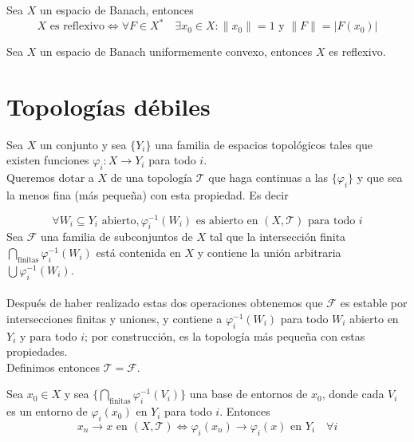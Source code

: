 \documentclass[12pt]{book}
\begin{document}
\begin{lema}
    Sea $X$ un espacio de Banach, entonces
    \begin{equation*}
        X \text{ es reflexivo} \iff \forall F \in X^* \quad \exists x_0 \in X : \|x_0\| = 1 \text{ y } \|F\| = |F(x_0)|
    \end{equation*}
\end{lema}

\begin{teo}
    Sea $X$ un espacio de Banach uniformemente convexo, entonces $X$ es reflexivo.
\end{teo}




\section{Topologías débiles}


\noindent
Sea $X$ un conjunto y sea $\{Y_i\}$ una familia de espacios topológicos tales que existen funciones $\varphi_i: X \to Y_i$ para todo $i$. \\

\noindent
Queremos dotar a $X$ de una topología $\mathcal{T}$ que haga continuas a las $\{\varphi_i\}$ y que sea la menos fina (más pequeña) con esta propiedad. Es decir

\begin{equation*}
    \forall W_i\subseteq Y_i \text{ abierto}, \varphi_i^{-1}(W_i) \text{ es abierto en } (X, \mathcal{T}) \text{ para todo } i
\end{equation*}
\noindent
Sea $\mathcal{F}$ una familia de subconjuntos de $X$ tal que la intersección finita $\bigcap\limits_{\text{finitas}} \varphi_i^{-1}(W_i)$ está contenida en $X$ y contiene la unión arbitraria $\bigcup \varphi_i^{-1}(W_i)$. \\ \\
\noindent
Después de haber realizado estas dos operaciones obtenemos que $\mathcal{F}$ es estable por intersecciones finitas y uniones, y contiene a $\varphi_i^{-1}(W_i)$ para todo $W_i$ abierto en $Y_i$ y para todo $i$; por construcción, es la topología más pequeña con estas propiedades. \\
\noindent
Definimos entonces $\mathcal{T} = \mathcal{F}$.


\begin{prop}
    Sea $x_0 \in X$ y sea $\{\bigcap\limits_{\text{finitas}} \varphi_i^{-1}(V_i)\}$ una base de entornos de $x_0$, donde cada $V_i$ es un entorno de $\varphi_i(x_0)$ en $Y_i$ para todo $i$. Entonces
    \begin{equation*}
        x_n \to x \text{ en } (X, \mathcal{T}) \iff \varphi_i(x_n) \to \varphi_i(x) \text{ en } Y_i \quad \forall i
    \end{equation*}
\end{prop}
\end{document}
